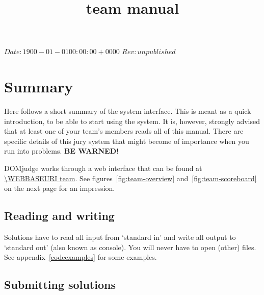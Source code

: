


\usepackage[english]{babel}

\SVN $Date: 1900-01-01 00:00:00 +0000 $
\SVN $Rev: unpublished $

\title{\DOMjudge team manual}




\titlestuff{\DOMJUDGEVERSION}{\SVNRev}{\SVNDate}{\today}

\section*{Summary}

Here follows a short summary of the system interface. This is meant as
a quick introduction, to be able to start using the system. It is,
however, strongly advised that at least one of your team's members
reads all of this manual. There are specific details of this
jury system that might become of importance when you run into
problems. \textbf{BE WARNED!}

DOMjudge works through a web interface that can be found at\\
\url{\WEBBASEURI team}. See figures~\ref{fig:team-overview}
and~\ref{fig:team-scoreboard} on the next page for an impression.

\subsection*{Reading and writing}

Solutions have to read all input from `standard in' and write all
output to `standard out' (also known as console). You will never have
to open (other) files. See appendix~\ref{codeexamples} for some
examples.

\subsection*{Submitting solutions}


